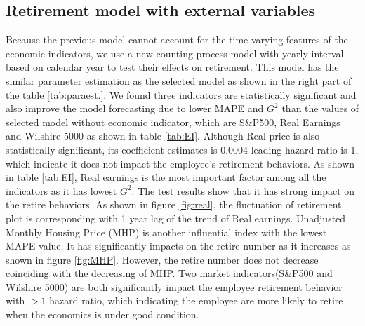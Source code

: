 \documentclass[12pt,letterpaper]{article}
\begin{document}
\subsection{Retirement model with external variables}
  Because the previous model cannot account for the time varying features of the economic indicators, we use a new counting process model with yearly interval based on calendar year to test their effects on retirement. This model has the similar parameter estimation as the selected model as shown in the right part of the table \ref{tab:paraest.}. We found three indicators are statistically significant and also improve the model forecasting due to lower MAPE and $G^2$ than the values of selected model without economic indicator, which are S\&P500, Real Earnings and Wilshire 5000 as shown in table \ref{tab:EI}. Although Real price is also statistically significant, its coefficient estimates is 0.0004 leading hazard ratio is 1, which indicate it does not impact the employee's retirement behaviors. As shown in table \ref{tab:EI}, Real earnings is the most important factor among all the indicators as it has lowest $G^2$. The test results show that it has strong impact on the retire behaviors. As shown in figure \ref{fig:real}, the fluctuation of retirement plot is corresponding with 1 year lag of the trend of Real earnings. Unadjusted Monthly Housing Price (MHP) is another influential index with the lowest MAPE value. It has significantly impacts on the retire number as it increases as shown in figure \ref{fig:MHP}. However, the retire number does not decrease coinciding with the decreasing of MHP. Two market indicators(S\&P500 and Wilshire 5000) are both significantly impact the employee retirement behavior with $>1$ hazard ratio, which indicating the employee are more likely to retire when the economics is under good condition.
\end{document}
